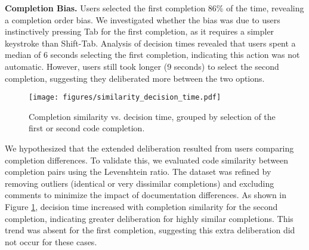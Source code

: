 \textbf{Completion Bias.} Users selected the first completion 86\% of the time, revealing a completion order bias. We investigated whether the bias was due to users instinctively pressing Tab for the first completion, as it requires a simpler keystroke than Shift-Tab. Analysis of decision times revealed that users spent a median of 6 seconds selecting the first completion, indicating this action was not automatic. However, users still took longer (9 seconds) to select the second completion, suggesting they deliberated more between the two options.

\begin{figure}[h]
\centering
\texttt{[image: figures/similarity\_decision\_time.pdf]}
\caption{Completion similarity vs. decision time, grouped by selection of the first or second code completion.}
\label{fig:similarity_decision}
\end{figure}

We hypothesized that the extended deliberation resulted from users comparing completion differences. To validate this, we evaluated code similarity between completion pairs using the Levenshtein ratio. The dataset was refined by removing outliers (identical or very dissimilar completions) and excluding comments to minimize the impact of documentation differences. As shown in Figure \ref{fig:similarity_decision}, decision time increased with completion similarity for the second completion, indicating greater deliberation for highly similar completions. This trend was absent for the first completion, suggesting this extra deliberation did not occur for these cases.

